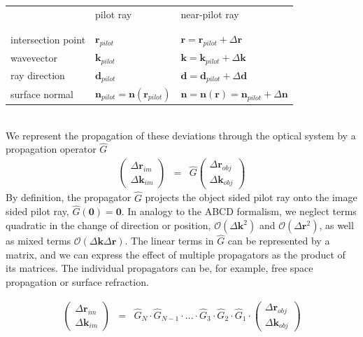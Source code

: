 \documentclass[12pt,a4paper,twoside,openright,BCOR10mm,headsepline,titlepage,abstracton,chapterprefix,final]{scrreprt}
\newcommand\Vector[1]{{\mathbf{#1}}}
\newcommand\wavenumber{k}
\newcommand\Wavevector{\Vector{\wavenumber}}
\newcommand{\orderof}[1]{\mathcal{O}(#1)}
\begin{document}
\begin{tabular}{ l | l | l }
		    & pilot ray & near-pilot ray \\
& & \\ \hline & & \\
intersection point  & $\Vector{r}_{pilot}$ & ${\Vector{r}} = \Vector{r}_{pilot} + \Delta\Vector{r}$ \\
wavevector  & $\Wavevector_{pilot}$ & ${\Wavevector} = \Wavevector_{pilot} + \Delta\Wavevector$ \\
ray direction  & $\Vector{d}_{pilot}$ & ${\Vector{d}} = \Vector{d}_{pilot} + \Delta\Vector{d}$ \\
surface normal      & $\Vector{n}_{pilot} = \Vector{n}(\Vector{r}_{pilot})$ & ${\Vector{n}} = \Vector{n}({\Vector{r}}) = \Vector{n}_{pilot} + \Delta\Vector{n}$ \\
\end{tabular}\\[2ex]
We represent the propagation of these deviations through the optical system by a propagation operator $\hat{G}$
\begin{eqnarray}
 \begin{pmatrix}
  \Delta \Vector{r}_{im} \\ \Delta \Wavevector_{im}
 \end{pmatrix}
 &=&
 \hat{G}
 \begin{pmatrix}
  \Delta \Vector{r}_{obj} \\ \Delta \Wavevector_{obj}
 \end{pmatrix}
\end{eqnarray}
By definition, the propagator $\hat{G}$ projects the object sided pilot ray onto the image sided pilot ray,
$\hat{G}(\Vector{0}) = \Vector{0}$.
In analogy to the ABCD formalism, we neglect terms quadratic in the change of direction or position, 
$\orderof{\Delta\Wavevector^2}$ and $\orderof{\Delta\Vector{r}^2}$, as well as mixed terms $\orderof{\Delta\Wavevector\Delta\Vector{r}}$.
The linear terms in $\hat{G}$ can be represented by a matrix,
and we can express the effect of multiple propagators as the product of its matrices.
The individual propagators can be, for example, free space propagation or surface refraction.

\begin{eqnarray}
 \begin{pmatrix}
  \Delta \Vector{r}_{im} \\ \Delta \Wavevector_{im}
 \end{pmatrix}
 &=&
 \hat{G}_N \cdot \hat{G}_{N-1} \cdot ... \cdot \hat{G}_3 \cdot \hat{G}_2 \cdot \hat{G}_1 \cdot
 \begin{pmatrix}
  \Delta \Vector{r}_{obj} \\ \Delta \Wavevector_{obj}
 \end{pmatrix}
\end{eqnarray}
\end{document}
